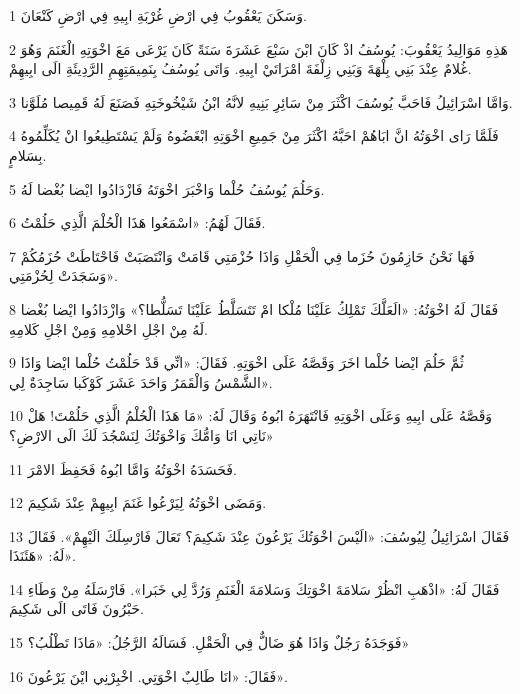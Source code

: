 \par 1 وَسَكَنَ يَعْقُوبُ فِي ارْضِ غُرْبَةِ ابِيهِ فِي ارْضِ كَنْعَانَ.
\par 2 هَذِهِ مَوَالِيدُ يَعْقُوبَ: يُوسُفُ اذْ كَانَ ابْنَ سَبْعَ عَشَرَةَ سَنَةً كَانَ يَرْعَى مَعَ اخْوَتِهِ الْغَنَمَ وَهُوَ غُلامٌ عِنْدَ بَنِي بِلْهَةَ وَبَنِي زِلْفَةَ امْرَاتَيْ ابِيهِ. وَاتَى يُوسُفُ بِنَمِيمَتِهِمِ الرَّدِيئَةِ الَى ابِيهِمْ.
\par 3 وَامَّا اسْرَائِيلُ فَاحَبَّ يُوسُفَ اكْثَرَ مِنْ سَائِرِ بَنِيهِ لانَّهُ ابْنُ شَيْخُوخَتِهِ فَصَنَعَ لَهُ قَمِيصا مُلَوَّنا.
\par 4 فَلَمَّا رَاى اخْوَتُهُ انَّ ابَاهُمْ احَبَّهُ اكْثَرَ مِنْ جَمِيعِ اخْوَتِهِ ابْغَضُوهُ وَلَمْ يَسْتَطِيعُوا انْ يُكَلِّمُوهُ بِسَلامٍ.
\par 5 وَحَلُمَ يُوسُفُ حُلْما وَاخْبَرَ اخْوَتَهُ فَازْدَادُوا ايْضا بُغْضا لَهُ.
\par 6 فَقَالَ لَهُمُ: «اسْمَعُوا هَذَا الْحُلْمَ الَّذِي حَلُمْتُ.
\par 7 فَهَا نَحْنُ حَازِمُونَ حُزَما فِي الْحَقْلِ وَاذَا حُزْمَتِي قَامَتْ وَانْتَصَبَتْ فَاحْتَاطَتْ حُزَمُكُمْ وَسَجَدَتْ لِحُزْمَتِي».
\par 8 فَقَالَ لَهُ اخْوَتُهُ: «الَعَلَّكَ تَمْلِكُ عَلَيْنَا مُلْكا امْ تَتَسَلَّطُ عَلَيْنَا تَسَلُّطا؟» وَازْدَادُوا ايْضا بُغْضا لَهُ مِنْ اجْلِ احْلامِهِ وَمِنْ اجْلِ كَلامِهِ.
\par 9 ثُمَّ حَلُمَ ايْضا حُلْما اخَرَ وَقَصَّهُ عَلَى اخْوَتِهِ. فَقَالَ: «انِّي قَدْ حَلُمْتُ حُلْما ايْضا وَاذَا الشَّمْسُ وَالْقَمَرُ وَاحَدَ عَشَرَ كَوْكَبا سَاجِدَةٌ لِي».
\par 10 وَقَصَّهُ عَلَى ابِيهِ وَعَلَى اخْوَتِهِ فَانْتَهَرَهُ ابُوهُ وَقَالَ لَهُ: «مَا هَذَا الْحُلْمُ الَّذِي حَلُمْتَ! هَلْ نَاتِي انَا وَامُّكَ وَاخْوَتُكَ لِنَسْجُدَ لَكَ الَى الارْضِ؟»
\par 11 فَحَسَدَهُ اخْوَتُهُ وَامَّا ابُوهُ فَحَفِظَ الامْرَ.
\par 12 وَمَضَى اخْوَتُهُ لِيَرْعُوا غَنَمَ ابِيهِمْ عِنْدَ شَكِيمَ.
\par 13 فَقَالَ اسْرَائِيلُ لِيُوسُفَ: «الَيْسَ اخْوَتُكَ يَرْعُونَ عِنْدَ شَكِيمَ؟ تَعَالَ فَارْسِلَكَ الَيْهِمْ». فَقَالَ لَهُ: «هَئَنَذَا».
\par 14 فَقَالَ لَهُ: «اذْهَبِ انْظُرْ سَلامَةَ اخْوَتِكَ وَسَلامَةَ الْغَنَمِ وَرُدَّ لِي خَبَرا». فَارْسَلَهُ مِنْ وَطَاءِ حَبْرُونَ فَاتَى الَى شَكِيمَ.
\par 15 فَوَجَدَهُ رَجُلٌ وَاذَا هُوَ ضَالٌّ فِي الْحَقْلِ. فَسَالَهُ الرَّجُلُ: «مَاذَا تَطْلُبُ؟»
\par 16 فَقَالَ: «انَا طَالِبٌ اخْوَتِي. اخْبِرْنِي ايْنَ يَرْعُونَ».
